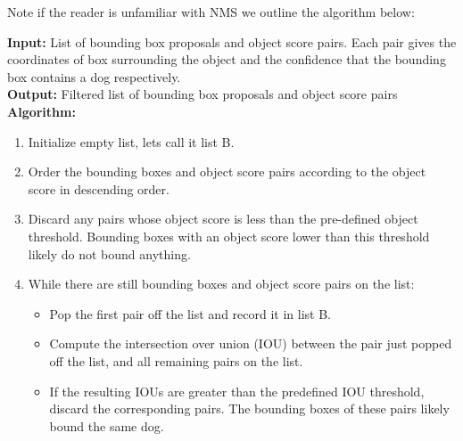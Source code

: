 \documentclass{article}
\begin{document}
\newpage

Note if the reader is unfamiliar with NMS we outline the algorithm below:  \\

\begin{minipage}{1\textwidth}%
  \noindent \textbf{Input:} List of bounding box proposals and object score pairs.  Each pair gives the coordinates of box surrounding the object and the confidence that the bounding box contains a dog respectively. \\
  
  \noindent \textbf{Output:} Filtered list of bounding box proposals and object score pairs \\
  
  \noindent \textbf{Algorithm:} \\
\end{minipage}%

\begin{enumerate}

  \item Initialize empty list, lets call it list B.

  \item Order the bounding boxes and object score pairs according to the object score in descending order.
  
  \item Discard any pairs whose object score is less than the pre-defined object threshold.  Bounding boxes with an object score lower than this threshold likely do not bound anything.
  
  \item While there are still bounding boxes and object score pairs on the list:
        \begin{itemize}
             \item Pop the first pair off the list and record it in list B.
            
             \item Compute the intersection over union (IOU) between the pair just popped off the list, and all remaining pairs on the list.
             \item If the resulting IOUs are greater than the predefined IOU threshold, discard the corresponding pairs.  The bounding boxes of these pairs likely bound the same dog.
        \end{itemize}
  

  
\end{enumerate}
\end{document}
